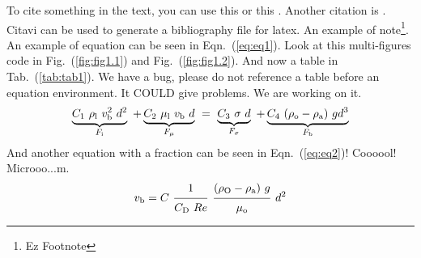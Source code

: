To cite something in the text, you can use this \cite{Rumsey.2008} or this \cite{Virkus.2003, Warmkessel.1997}. Another citation is \cite{Rogow.2004}. Citavi can be used to generate a bibliography file for latex. An example of note\footnote{Ez Footnote}.  An example of equation can be seen in Eqn.~(\ref{eq:eq1}). Look at this multi-figures code in Fig.~(\ref{fig:fig1.1}) and Fig.~(\ref{fig:fig1.2}). And now a table in Tab.~(\ref{tab:tab1}). We have a bug, please do not reference a table before an equation environment. It COULD give problems. We are working on it.
\begin{equation}
\underbrace{C_{\s{1}} \ \rho_{\s{l}} \ v_{\s{b}}^2 \ d^{2}}_{F_\s{i}} \ + \underbrace{C_{\s{2}} \ \mu_{\s{l}} \ v_\s{b} \ d}_{F_\s{\mu}} \ = \ \underbrace {C_{\s{3}} \ \sigma \ d}_{F_\s{\sigma}} \ + \underbrace{C_{\s{4}} \ (\rho_\s{o} - \rho_\s{a}) \ g d^{3}}_{F_\s{b}}
\label{eq:eq1}
\end{equation} 
And another equation with a fraction can be seen in Eqn.~(\ref{eq:eq2})! Coooool! Microoo...\charmu m. 
\begin{equation}
v_\s{b}=C \ \myfrac[2pt]{1}{C_\s{D} \ Re} \ \myfrac[2pt]{(\rho_\s{O} - \rho_\s{a}) \ g}{\mu_\s{o}} \ d^2
\label{eq:eq2}
\end{equation}
